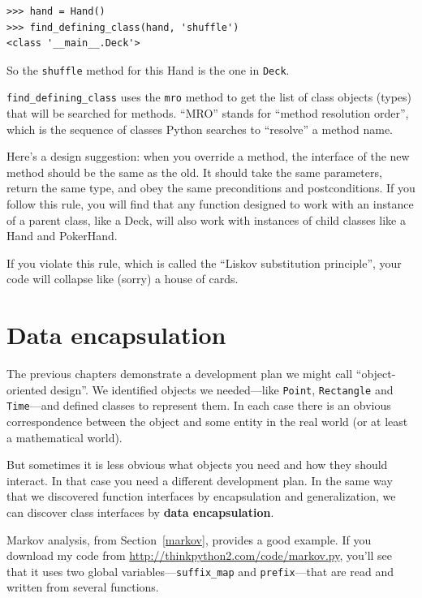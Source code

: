 \documentclass[10pt]{book}
\begin{document}
\begin{verbatim}
>>> hand = Hand()
>>> find_defining_class(hand, 'shuffle')
<class '__main__.Deck'>
\end{verbatim}
%
So the {\tt shuffle} method for this Hand is the one in {\tt Deck}.

\verb"find_defining_class" uses the {\tt mro} method to get the list
of class objects (types) that will be searched for methods.  ``MRO''
stands for ``method resolution order'', which is the sequence of
classes Python searches to ``resolve'' a method name.

Here's a design suggestion: when you override a method,
the interface of the new method should be the same as the old.  It
should take the same parameters, return the same type, and obey the
same preconditions and postconditions.  If you follow this rule, you
will find that any function designed to work with an instance of a
parent class, like a Deck, will also work with instances of child
classes like a Hand and PokerHand.

If you violate this rule, which is called the ``Liskov substitution
principle'', your code will collapse like (sorry) a house of cards.


\section{Data encapsulation}

The previous chapters demonstrate a development plan we might call
``object-oriented design''.  We identified objects we needed---like
{\tt Point}, {\tt Rectangle} and {\tt Time}---and defined classes to
represent them.  In each case there is an obvious correspondence
between the object and some entity in the real world (or at least a
mathematical world).  

But sometimes it is less obvious what objects you need
and how they should interact.  In that case you need a different
development plan.  In the same way that we discovered function
interfaces by encapsulation and generalization, we can discover
class interfaces by {\bf data encapsulation}.

Markov analysis, from Section~\ref{markov}, provides a good example.
If you download my code from \url{http://thinkpython2.com/code/markov.py},
you'll see that it uses two global variables---\verb"suffix_map" and
\verb"prefix"---that are read and written from several functions.
\end{document}
